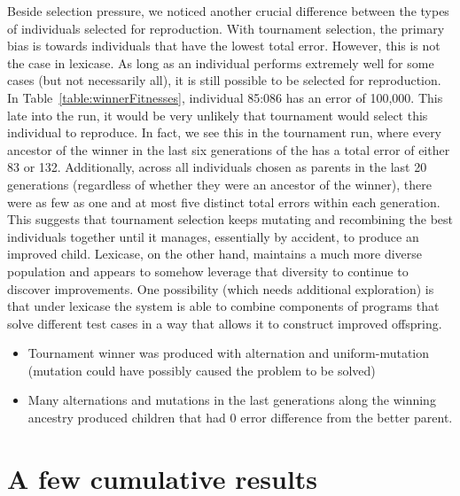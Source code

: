 Beside selection pressure, we noticed another crucial difference between the types of individuals 
selected for reproduction. With tournament selection, the primary bias is towards individuals that 
have the lowest total error. However, this is not the case in lexicase.  As long as an individual 
performs extremely well for some cases (but not necessarily all), it is still possible to be selected for 
reproduction. In Table~\ref{table:winnerFitnesses}, individual 85:086 has an error of 100,000. 
This late into the run, it would be very unlikely that tournament would select this individual to 
reproduce. In fact, we see this in the tournament run, where every ancestor of the winner in the
last six generations of the
has a total error of either 83 or 132. Additionally, across all individuals chosen
as parents in the last 20 generations (regardless of whether they were an ancestor of the winner), 
there were as few as one and at most five distinct total errors within each generation. 
This suggests that tournament selection keeps
mutating and recombining the best individuals together until it manages, essentially by accident, to produce an improved 
child. Lexicase, on the other hand, maintains a much more diverse population and appears to somehow leverage that
diversity to continue to discover improvements. One possibility (which needs additional exploration) is that under lexicase 
the system is able to combine components of programs that solve different test cases in a way that allows it
to construct improved offspring.

\begin{itemize}
	\item Tournament winner was produced with alternation and uniform-mutation (mutation could have possibly caused the problem to be solved)
	\item Many alternations and mutations in the last generations along the winning ancestry produced children that had 0 error difference from the better parent. 
\end{itemize}





\section{A few cumulative results}
\label{sec:cumulativeResults}

